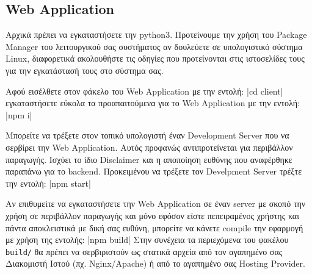 \documentclass[a4paper]{article}
\begin{document}
\subsection{Web Application}

\par Αρχικά πρέπει να εγκαταστήσετε την python3. Προτείνουμε την χρήση του Package Manager του λειτουργικού σας συστήματος αν δουλεύετε σε υπολογιστικό σύστημα Linux, διαφορετικά ακολουθήστε τις οδηγίες που προτείνονται στις ιστοσελίδες τους για την εγκατάστασή τους στο σύστημα σας.

\par Αφού εισέλθετε στον φάκελο του Web Application με την εντολή:
|cd client|
εγκαταστήσετε εύκολα τα προαπαιτούμενα για το Web Application με την εντολή:
|npm i|

\par Μπορείτε να τρέξετε στον τοπικό υπολογιστή έναν Development Server που να σερβίρει την Web Application. Αυτός προφανώς αντιπροτείνεται για περιβάλλον παραγωγής. Ισχύει το ίδιο Disclaimer και η αποποίηση ευθύνης που αναφέρθηκε παραπάνω για το backend. Προκειμένου να τρέξετε τον Develpment Server τρέξτε την εντολή:
|npm start|

\par Αν επιθυμείτε να εγκαταστήσετε την Web Application σε έναν server με σκοπό την χρήση σε περιβάλλον παραγωγής και μόνο εφόσον είστε πεπειραμένος χρήστης και πάντα αποκλειστικά με δική σας ευθύνη, μπορείτε να κάνετε compile την εφαρμογή με χρήση της εντολής:
|npm build|
Στην συνέχεια τα περιεχόμενα του φακέλου \texttt{build/} θα πρέπει να σερβιριστούν ως στατικά αρχεία από τον αγαπημένο σας Διακομιστή Ιστού (πχ. Nginx/Apache) ή από το αγαπημένο σας Hosting Provider.
\end{document}
